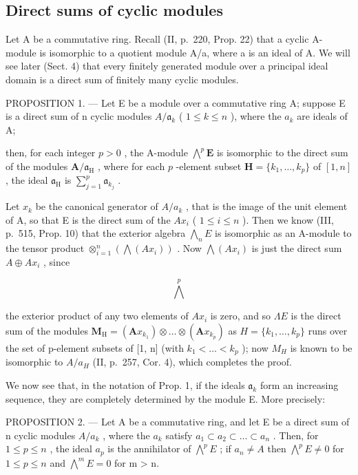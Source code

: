 \subsection{Direct sums of cyclic modules}

Let A be a commutative ring. Recall (II, p.~220, Prop. 22) that a cyclic A-module is isomorphic to a quotient module A/a, where a is an ideal of A. We will see later (Sect. 4) that every finitely generated module over a principal ideal domain is a direct sum of finitely many cyclic modules.

PROPOSITION 1. --- Let E be a module over a commutative ring A; suppose E is a direct sum of n cyclic modules \(A/\mathfrak{a}_{k}\) ( \(1 \leqslant k \leqslant n\) ), where the \(a_{k}\) are ideals of A;

then, for each integer \(p > 0\) , the A-module \(\bigwedge^p \mathbf{E}\) is isomorphic to the direct sum of the modules \(\mathbf{A} / \mathfrak{a}_{\mathrm{H}}\) , where for each \(p\) -element subset \(\mathbf{H} = \{k_1, \dots, k_p\}\) of \([1, n]\) , the ideal \(\mathfrak{a}_{\mathrm{H}}\) is \(\sum_{j=1}^{p} \mathfrak{a}_{k_j}\) .

Let \(x_{k}\) be the canonical generator of \(A / a_{k}\) , that is the image of the unit element of A, so that E is the direct sum of the \(Ax_{i}\) ( \(1 \leqslant i \leqslant n\) ). Then we know (III, p.~515, Prop. 10) that the exterior algebra \(\bigwedge_{n} E\) is isomorphic as an A-module to the tensor product \(\otimes_{i=1}^{n} (\bigwedge(Ax_{i}))\) . Now \(\bigwedge(Ax_{i})\) is just the direct sum \(A \oplus Ax_{i}\) , since

\[
\bigwedge^ {p}
\]

the exterior product of any two elements of \(Ax_{i}\) is zero, and so \(\Lambda E\) is the direct sum of the modules \(\mathbf{M}_{\mathrm{H}} = (\mathbf{A}x_{k_{1}}) \otimes \ldots \otimes (\mathbf{A}x_{k_{p}})\) as \(H = \{k_{1}, \ldots, k_{p}\}\) runs over the set of p-element subsets of {[}1, n{]} (with \(k_{1} < \ldots < k_{p}\) ); now \(M_{H}\) is known to be isomorphic to \(A/a_{H}\) (II, p.~257, Cor. 4), which completes the proof.

We now see that, in the notation of Prop. 1, if the ideals \(\mathfrak{a}_k\) form an increasing sequence, they are completely determined by the module E. More precisely:

PROPOSITION 2. --- Let A be a commutative ring, and let E be a direct sum of n cyclic modules \(A/a_{k}\) , where the \(a_{k}\) satisfy \(a_{1} \subset a_{2} \subset \ldots \subset a_{n}\) . Then, for \(1 \leqslant p \leqslant n\) , the ideal \(a_{p}\) is the annihilator of \(\bigwedge^{p} E\) ; if \(a_{n} \neq A\) then \(\bigwedge^{p} E \neq 0\) for \(1 \leqslant p \leqslant n\) and \(\bigwedge^{m} E = 0\) for m \textgreater{} n.


